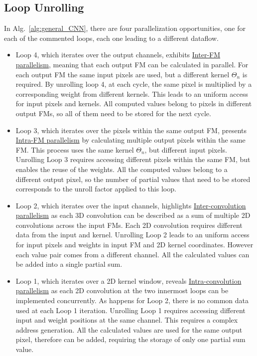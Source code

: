 \subsection{Loop Unrolling}
\label{sec:loop_unrolling}
In Alg.~\ref{alg:general_CNN}, there are four parallelization opportunities, one for each of the commented loops, each one leading to a different dataflow.


\begin{itemize}
	\item Loop 4, which iterates over the output channels, exhibits \underline{Inter-FM parallelism}, meaning that each output FM can be calculated in parallel. For each output FM the same input pixels are used, but a different kernel $\Theta_n$ is required. By unrolling loop 4, at each cycle, the same pixel is multiplied by a corresponding
	weight from different kernels. This leads to an uniform access for input pixels
	and kernels. All computed values belong to pixels in different output FMs, so
	all of them need to be stored for the next cycle.
	\item Loop 3, which iterates over the pixels within the same output FM, presents \underline{Intra-FM parallelism} by calculating multiple output pixels within the same FM. This process uses the same kernel $\Theta_n$, but different input pixels. Unrolling Loop 3 requires accessing different pixels within the same FM, but
	enables the reuse of the weights. All the computed values belong to a different
	output pixel, so the number of partial values that need to be stored corresponds
	to the unroll factor applied to this loop.
	\item Loop 2, which iterates over the input channels, highlights \underline{Inter-convolution parallelism} as each 3D convolution can be described as a sum of multiple 2D convolutions across the input FMs. Each 2D convolution requires different data from the input and kernel. Unrolling Loop 2 leads to an uniform access for input pixels and weights in input FM and 2D kernel coordinates. However each value pair comes from a different
	channel. All the calculated values can be added into a single partial sum.
	\item Loop 1, which iterates over a 2D kernel window, reveals \underline{Intra-convolution parallelism} as each 2D convolution at the two innermost loops can be implemented concurrently. As happens for Loop 2, there is no common data used at each Loop 1 iteration. Unrolling Loop 1 requires accessing different input and weight positions at the
	same channel. This requires a complex address generation. All the calculated
	values are used for the same output pixel, therefore can be added, requiring the
	storage of only one partial sum value.
\end{itemize}
